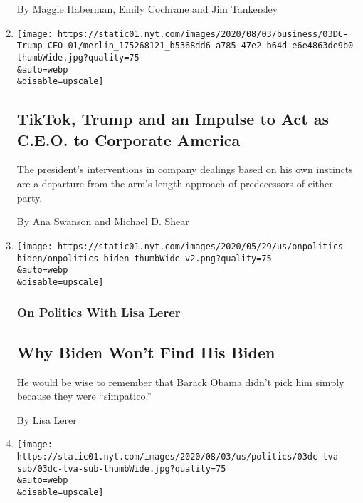 \begin{enumerate}
  By Maggie Haberman, Emily Cochrane and Jim Tankersley
\item
  \href{/2020/08/03/business/economy/trump-tiktok-china-business.html}{}

  \texttt{[image: https://static01.nyt.com/images/2020/08/03/business/03DC-Trump-CEO-01/merlin\_175268121\_b5368dd6-a785-47e2-b64d-e6e4863de9b0-thumbWide.jpg?quality=75\\\&auto=webp\\\&disable=upscale]}

  \hypertarget{tiktok-trump-and-an-impulse-to-act-as-ceo-to-corporate-america}{%
  \subsection{TikTok, Trump and an Impulse to Act as C.E.O. to Corporate
  America}\label{tiktok-trump-and-an-impulse-to-act-as-ceo-to-corporate-america}}

  The president's interventions in company dealings based on his own
  instincts are a departure from the arm's-length approach of
  predecessors of either party.

  By Ana Swanson and Michael D. Shear
\item
  \href{/2020/08/03/us/politics/joe-biden-vp.html}{}

  \texttt{[image: https://static01.nyt.com/images/2020/05/29/us/onpolitics-biden/onpolitics-biden-thumbWide-v2.png?quality=75\\\&auto=webp\\\&disable=upscale]}

  \hypertarget{on-politics-with-lisa-lerer}{%
  \subsubsection{On Politics With Lisa
  Lerer}\label{on-politics-with-lisa-lerer}}

  \hypertarget{why-biden-wont-find-his-biden}{%
  \subsection{Why Biden Won't Find His
  Biden}\label{why-biden-wont-find-his-biden}}

  He would be wise to remember that Barack Obama didn't pick him simply
  because they were ``simpatico.''

  By Lisa Lerer
\item
  \href{/2020/08/03/us/politics/trump-tennessee-valley-authority.html}{}

  \texttt{[image: https://static01.nyt.com/images/2020/08/03/us/politics/03dc-tva-sub/03dc-tva-sub-thumbWide.jpg?quality=75\\\&auto=webp\\\&disable=upscale]}


\end{enumerate}
